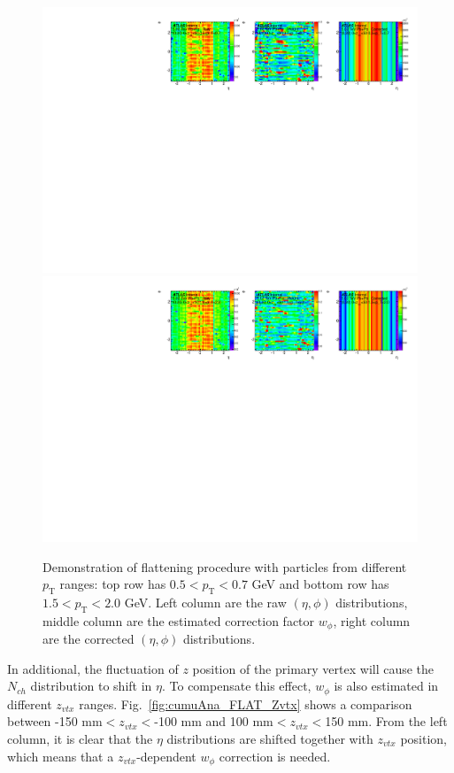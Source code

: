 \begin{figure}[H]
\centering
\includegraphics[width=.9\linewidth]{figs/sec_ana/cumuFlat_Cent0_Zvtx5_Chg0_Pt1.pdf}
\includegraphics[width=.9\linewidth]{figs/sec_ana/cumuFlat_Cent0_Zvtx5_Chg0_Pt4.pdf}
\caption{Demonstration of flattening procedure with particles from different $p_\text{T}$ ranges: top row has $0.5<p_\text{T}<0.7$ GeV and bottom row has $1.5<p_\text{T}<2.0$ GeV. Left column are the raw $(\eta,\phi)$ distributions, middle column are the estimated correction factor $w_{\phi}$, right column are the corrected $(\eta,\phi)$ distributions. }
\label{fig:cumuAna_FLAT_Pt}
\end{figure}

In additional, the fluctuation of $z$ position of the primary vertex will cause the $N_{ch}$ distribution to shift in $\eta$. To compensate this effect, $w_\phi$ is also estimated in different $z_{vtx}$ ranges. Fig.~\ref{fig:cumuAna_FLAT_Zvtx} shows a comparison between -150 mm$<z_{vtx}<$-100 mm and 100 mm$<z_{vtx}<$150 mm. From the left column, it is clear that the $\eta$ distributions are shifted together with $z_{vtx}$ position, which means that a $z_{vtx}$-dependent $w_\phi$ correction is needed.

